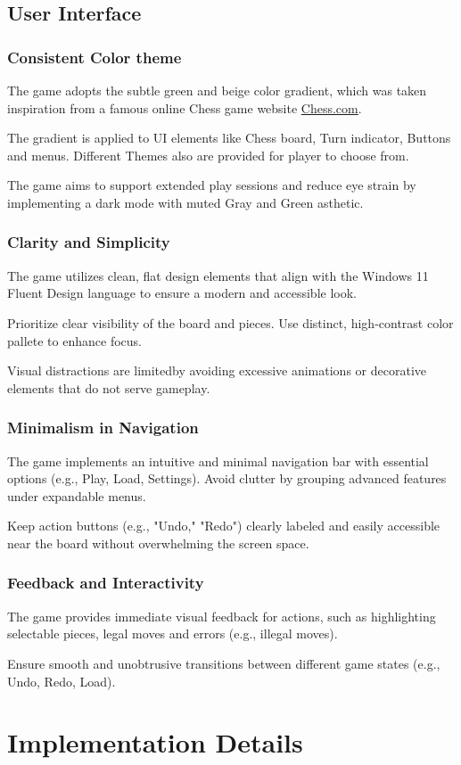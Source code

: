 \documentclass[a4paper, 10pt, titlepage]{report}
\begin{document}
\section{User Interface}
\subsection{Consistent Color theme}
The game adopts the subtle green and beige color gradient, which was taken inspiration from a famous online Chess game website \href{https://chess.com/}{Chess.com}.

The gradient is applied to UI elements like Chess board, Turn indicator, Buttons and menus. Different Themes also are provided for player to choose from.

The game aims to support extended play sessions and reduce eye strain by implementing a dark mode with muted Gray and Green asthetic.
\subsection{Clarity and Simplicity}
The game utilizes clean, flat design elements that align with the Windows 11 Fluent Design language to ensure a modern and accessible look.

Prioritize clear visibility of the board and pieces. Use distinct, high-contrast color pallete to enhance focus.

Visual distractions are limitedby avoiding excessive animations or decorative elements that do not serve gameplay.
\subsection{Minimalism in Navigation}
The game implements an intuitive and minimal navigation bar with essential options (e.g., Play, Load, Settings). Avoid clutter by grouping advanced features under expandable menus.

Keep action buttons (e.g., "Undo," "Redo") clearly labeled and easily accessible near the board without overwhelming the screen space.
\subsection{Feedback and Interactivity}
The game provides immediate visual feedback for actions, such as highlighting selectable pieces, legal moves and errors (e.g., illegal moves).

Ensure smooth and unobtrusive transitions between different game states (e.g., Undo, Redo, Load).
\chapter{Implementation Details}
\end{document}
